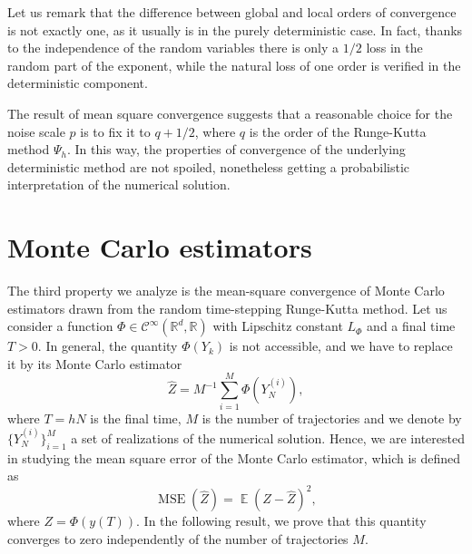 \documentclass{siamart1116}
\numberwithin{theorem}{section}
\newcommand{\R}{\mathbb{R}}
\newcommand{\E}{\operatorname{\mathbb{E}}}
\newcommand{\MSE}{\operatorname{MSE}}
\newcommand{\sksum}{{\textstyle\sum}}
\newcommand{\corr}[1]{{\color{bordeaux}#1}}
\begin{document}
\begin{remark} Let us remark that the difference between global and local orders of convergence is not exactly one, as it usually is in the purely deterministic case. In fact, thanks to the independence of the random variables there is only a $1/2$ loss in the random part of the exponent, while the natural loss of one order is verified in the deterministic component.
\end{remark}
\begin{remark} The result of mean square convergence suggests that a reasonable choice for the noise scale $p$ is to fix it to  $q + 1/2$, where $q$ is the order of the Runge-Kutta method $\Psi_h$. In this way, the properties of convergence of the underlying deterministic method are not spoiled, nonetheless getting a probabilistic interpretation of the numerical solution.
\end{remark}


\section{Monte Carlo estimators}\label{sec:MonteCarlo}

The third property we analyze is the mean-square convergence of Monte Carlo estimators drawn from the random time-stepping Runge-Kutta method. \corr{Let us consider} a function $\Phi\in\mathcal{C}^\infty(\R^d, \R)$ with Lipschitz constant $L_\Phi$ and a final time $T > 0$. \corr{In general, the quantity $\Phi(Y_k)$ is not accessible, and we have to replace it by} its Monte Carlo estimator 
\begin{equation}\label{eq:MSE}
	\hat Z = M^{-1} \sksum_{i = 1}^M \Phi(Y_N^{(i)}),
\end{equation}
where $T = hN$ is the final time, $M$ is the number of trajectories and we denote by $\{Y_N^{(i)}\}_{i=1}^M$ a set of realizations of the numerical solution. \corr{Hence, we are interested in studying the mean square error of the Monte Carlo estimator, which is defined as
\begin{equation}
	\MSE(\hat Z) = \E(Z - \hat Z)^2,
\end{equation}
where $Z = \Phi(y(T))$}. In the following result, we prove that this quantity converges to zero independently of the number of trajectories $M$.
\end{document}
